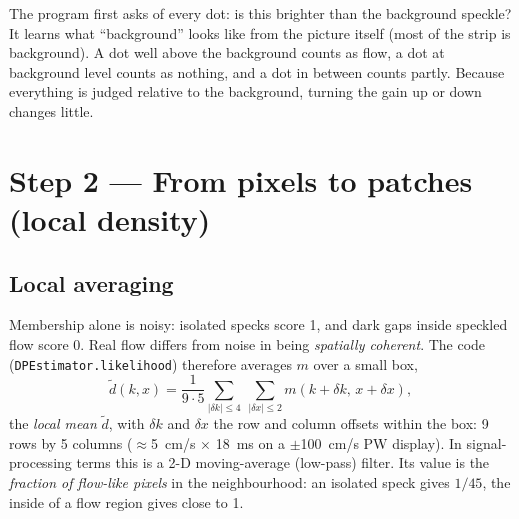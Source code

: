\documentclass[11pt,a4paper]{article}
\newcommand{\code}[1]{\texttt{\small #1}}
\begin{document}
\begin{plainbox}
The program first asks of every dot: is this brighter than the background speckle? It learns what ``background''
looks like from the picture itself (most of the strip is background). A dot well above the background counts as
flow, a dot at background level counts as nothing, and a dot in between counts partly. Because everything is
judged relative to the background, turning the gain up or down changes little.
\end{plainbox}

\section{Step 2 --- From pixels to patches (local density)}
\label{sec:dens}

\subsection{Local averaging}
Membership alone is noisy: isolated specks score 1, and dark gaps inside speckled flow score 0. Real flow differs
from noise in being \emph{spatially coherent}. The code (\code{DPEstimator.likelihood}) therefore averages $m$ over a
small box,
\begin{equation}
\tilde d(k,x) = \frac{1}{9\cdot 5}\sum_{|\delta k|\le 4}\ \sum_{|\delta x| \le 2} m(k+\delta k,\, x+\delta x),
\end{equation}
the \emph{local mean} $\tilde d$, with $\delta k$ and $\delta x$ the row and column offsets within the box:
9 rows by 5 columns ($\approx$5~cm/s $\times$ 18~ms on a $\pm$100~cm/s PW display). In signal-processing terms this is
a 2-D moving-average (low-pass) filter. Its value is the \emph{fraction of flow-like pixels} in the neighbourhood: an
isolated speck gives $1/45$, the inside of a flow region gives close to 1.
\end{document}
